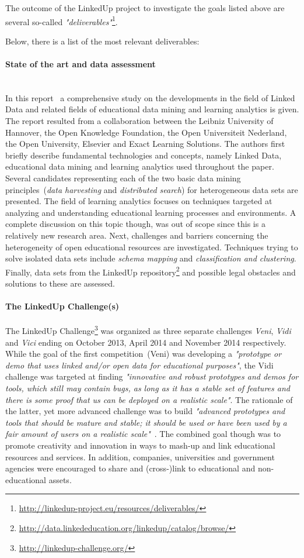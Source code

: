 \documentclass{article}
\begin{document}
The outcome of the LinkedUp project to investigate the goals listed above are several so-called \textit{"deliverables"}\footnote{\url{http://linkedup-project.eu/resources/deliverables/}}. 

Below, there is a list of the most relevant deliverables:
\paragraph{State of the art and data assessment}~\\
In this report~\cite{herder_state_2013} a comprehensive study on the developments in the field of Linked Data and
related fields of educational data mining and learning analytics is given. The report resulted from a collaboration between the Leibniz University of Hannover, the Open Knowledge Foundation, the Open Universiteit Nederland, the Open University, Elsevier and Exact Learning Solutions. The authors first briefly describe fundamental technologies and concepts, namely Linked Data, educational data mining and learning analytics used throughout the paper. Several candidates representing each of the two basic data mining principles~(\textit{data harvesting} and \textit{distributed search}) for heterogeneous data sets are presented. The field of learning analytics focuses on techniques targeted at analyzing and understanding educational learning processes and environments. A complete discussion on this topic though, was out of scope since this is a relatively new research area. Next, challenges and barriers concerning the heterogeneity of open educational resources are investigated. Techniques trying to solve isolated data sets include \textit{schema mapping} and \textit{classification and clustering}. Finally, data sets from the LinkedUp repository\footnote{\url{http://data.linkededucation.org/linkedup/catalog/browse/}} and possible legal obstacles and solutions to these are assessed. 

\paragraph{The LinkedUp Challenge(s)}
The LinkedUp Challenge\footnote{\url{http://linkedup-challenge.org/}} was organized as three separate challenges \textit{Veni}, \textit{Vidi} and \textit{Vici} ending on October 2013, April 2014 and November 2014 respectively. While the goal of the first competition~(Veni) was developing a \textit{"prototype or demo that uses linked and/or open data for educational purposes"}, the Vidi challenge was targeted at finding \textit{"innovative and robust prototypes and demos for tools, which still may contain bugs, as long as it has a stable set of features and there is some proof that us can be deployed on a realistic scale"}. The rationale of the latter, yet more advanced challenge was to build \textit{"advanced prototypes and tools that should be mature and stable; it should be used or have been used by a fair amount of users on a realistic scale"}~\cite{herder_linkedup_2014}. 
The combined goal though was to promote creativity and innovation in ways to mash-up and link educational resources and services. In addition, companies, universities and government agencies were encouraged to share and (cross-)link to educational and non-educational assets. 
\end{document}
